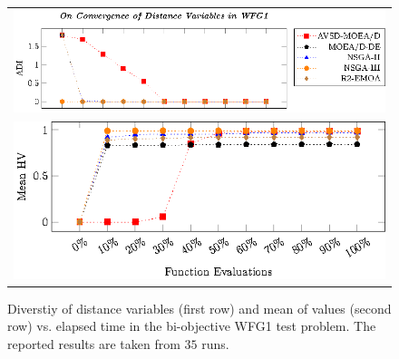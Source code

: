 \begin{figure}[t]
\centering
\begin{tabular}{l}
 \includegraphics[scale=0.8]{images/Diversity_Long_Term_tikz_WFG1-figure0.eps}\\[0cm]%
 \includegraphics[scale=0.8]{images/Diversity_Long_Term_tikz_WFG1-figure1.eps}\\[0cm]%
\end{tabular}
\caption{Diverstiy of distance variables (first row) and mean of \HV{} values (second row) vs. elapsed time in the bi-objective WFG1 test problem. The reported results are taken from $35$ runs.}\label{fig:WFG1_Diversity}
\end{figure}


